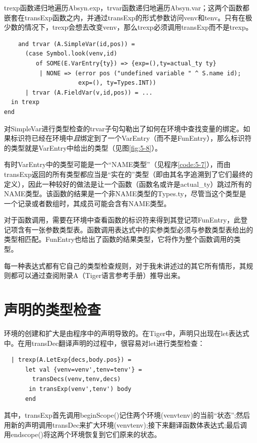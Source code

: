 \documentclass[cn,11pt,chinese]{elegantbook}
\begin{document}
trexp函数递归地遍历Absyn.exp，trvar函数递归地遍历Absyn.var；这两个函数都嵌套在transExp函数之内，并通过transExp的形式参数访问venv和tenv。只有在极少数的情况下，trexp会想去改变venv，那么trexp必须调用transExp而不是trexp。

\begin{lstlisting}
    and trvar (A.SimpleVar(id,pos)) =
      (case Symbol.look(venv,id)
         of SOME(E.VarEntry{ty}) => {exp=(),ty=actual_ty ty}
          | NONE => (error pos ("undefined variable " ^ S.name id);
                     exp=(), ty=Types.INT))
      | trvar (A.FieldVar(v,id,pos)) = ...
  in trexp
end
\end{lstlisting}

对SimpleVar进行类型检查的trvar子句勾勒出了如何在环境中查找变量的绑定。如果标识符已经在环境中\textit{且}绑定到了一个VarEntry（而不是FunEntry），那么标识符的类型就是VarEntry中给出的类型（见图\ref{fig:5-8}）。

有时VarEntry中的类型可能是一个“NAME类型”（见程序\ref{code:5-7}），而由transExp返回的所有类型都应当是“实在的”类型（即由其名字追溯到了它们最终的定义），因此一种较好的做法是让一个函数（函数名或许是actual\_ty）跳过所有的NAME类型。该函数的结果是一个非NAME类型的Types.ty，尽管当这个类型是一个记录或者数组时，其成员可能会含有NAME类型。

对于函数调用，需要在环境中查看函数的标识符来得到其登记项FunEntry，此登记项含有一张参数类型表。函数调用表达式中的实参类型必须与参数类型表给出的类型相匹配。FunEntry也给出了函数的结果类型，它将作为整个函数调用的类型。

每一种表达式都有它自己的类型检查规则，对于我未讲述过的其它所有情形，其规则都可以通过查阅附录A（Tiger语言参考手册）推导出来。

\section{声明的类型检查}

环境的创建和扩大是由程序中的声明导致的。在Tiger中，声明只出现在let表达式中。在用transDec翻译声明的过程中，很容易对let进行类型检查：

\begin{lstlisting}
  | trexp(A.LetExp{decs,body.pos}) =
      let val {venv=venv',tenv=tenv'} =
        transDecs(venv,tenv,decs)
       in transExp(venv',tenv') body
      end
\end{lstlisting}

其中，transExp首先调用beginScope()记住两个环境(venvtenv)的当前“状态”;然后用新的声明调用transDec来扩大环境(venvtenv);接下来翻译函数体表达式;最后调用endscope()将这两个环境恢复到它们原来的状态。
\end{document}
